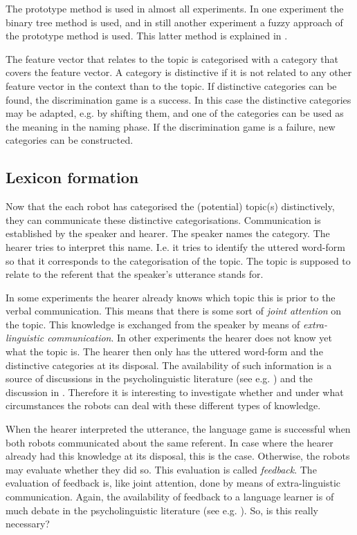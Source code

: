 The prototype method is used in almost all experiments. In one experiment the binary tree method is used, and in still another experiment a fuzzy approach of the prototype method is used. This latter method is explained in .

The feature vector that relates to the topic is categorised with a category that covers the feature vector. A category is distinctive if it is not related to any other feature vector in the context than to the topic. If distinctive categories can be found, the discrimination game is a success. In this case the distinctive categories may be adapted, e.g. by shifting them, and one of the categories can be used as the meaning in the naming phase. If the discrimination game is a failure, new categories can be constructed.

\subsection{Lexicon formation}\label{s:cm:ng}

Now that the each robot has categorised the (potential) topic(s) distinctively, they can communicate these distinctive categorisations. Communication is established by the speaker and hearer. The speaker names the category. The hearer tries to interpret this name. I.e. it tries to identify the uttered word-form so that it corresponds to the categorisation of the topic. The topic is supposed to relate to the referent that the speaker's utterance stands for. 

In some experiments the hearer already knows which topic this is prior to the verbal communication. This means that there is some sort of {\em joint attention} on the topic. This knowledge is exchanged from the speaker by means of {\em extra-linguistic communication}. In other experiments the hearer does not know yet what the topic is. The hearer then only has the uttered word-form and the distinctive categories at its disposal. The availability of such information is a source of discussions in the psycholinguistic literature (see e.g. \citealt{barrett:1995}) and the discussion in . Therefore it is interesting to investigate whether and under what circumstances the robots can deal with these different types of knowledge.

When the hearer interpreted the utterance, the language game is successful when both robots communicated about the same referent. In case where the hearer already had this knowledge at its disposal, this is the case. Otherwise, the robots may evaluate whether they did so. This evaluation is called {\em feedback}. The evaluation of feedback is, like joint attention, done by means of extra-linguistic communication. Again, the availability of feedback to a language learner is of much debate in the psycholinguistic literature (see e.g. \citealt{bowerman:1988}). So, is this really necessary? 

